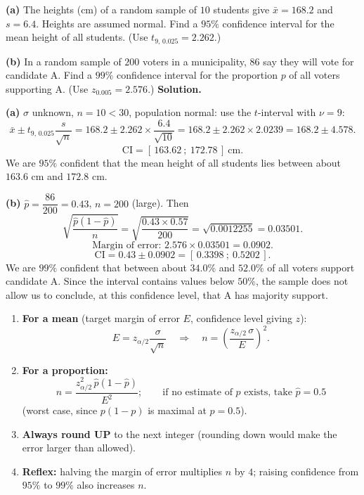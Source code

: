 \documentclass[11pt]{article}
\begin{document}
\begin{exoresolu}
\textbf{(a)} The heights (cm) of a random sample of $10$ students give $\bar{x}=168.2$ and $s=6.4$. Heights are assumed normal. Find a $95\%$ confidence interval for the mean height of all students. (Use $t_{9,\,0.025}=2.262$.)

\textbf{(b)} In a random sample of $200$ voters in a municipality, $86$ say they will vote for candidate A. Find a $99\%$ confidence interval for the proportion $p$ of all voters supporting A. (Use $z_{0.005}=2.576$.)
\tcblower
\textbf{Solution.}

\textbf{(a)} $\sigma$ unknown, $n=10<30$, population normal: use the $t$-interval with $\nu=9$:
\[
\bar{x}\pm t_{9,\,0.025}\frac{s}{\sqrt{n}}
=168.2\pm 2.262\times\frac{6.4}{\sqrt{10}}
=168.2\pm 2.262\times 2.0239
=168.2\pm 4.578.
\]
\[
\text{CI} = [\,163.62\ ;\ 172.78\,]\ \mathrm{cm}.
\]
We are $95\%$ confident that the mean height of all students lies between about $163.6$ cm and $172.8$ cm.

\textbf{(b)} $\hat{p}=\dfrac{86}{200}=0.43$, $n=200$ (large). Then
\[
\sqrt{\frac{\hat{p}(1-\hat{p})}{n}}=\sqrt{\frac{0.43\times0.57}{200}}=\sqrt{0.0012255}=0.03501.
\]
\[
\text{Margin of error: } 2.576\times0.03501=0.0902.
\]
\[
\text{CI} = 0.43\pm0.0902 = [\,0.3398\ ;\ 0.5202\,].
\]
We are $99\%$ confident that between about $34.0\%$ and $52.0\%$ of all voters support candidate A. Since the interval contains values below $50\%$, the sample does not allow us to conclude, at this confidence level, that A has majority support.
\end{exoresolu}

\begin{methode}
\begin{enumerate}
\item \textbf{For a mean} (target margin of error $E$, confidence level giving $z$):
\[
E=z_{\alpha/2}\frac{\sigma}{\sqrt{n}}
\quad\Longrightarrow\quad
n=\left(\frac{z_{\alpha/2}\,\sigma}{E}\right)^{2}.
\]
\item \textbf{For a proportion:}
\[
n=\frac{z_{\alpha/2}^{2}\,\hat{p}(1-\hat{p})}{E^{2}};
\qquad\text{if no estimate of }p\text{ exists, take } \hat p = 0.5
\]
(worst case, since $p(1-p)$ is maximal at $p=0.5$).
\item \textbf{Always round UP} to the next integer (rounding down would make the error larger than allowed).
\item \textbf{Reflex:} halving the margin of error multiplies $n$ by $4$; raising confidence from $95\%$ to $99\%$ also increases $n$.
\end{enumerate}
\end{methode}
\end{document}
